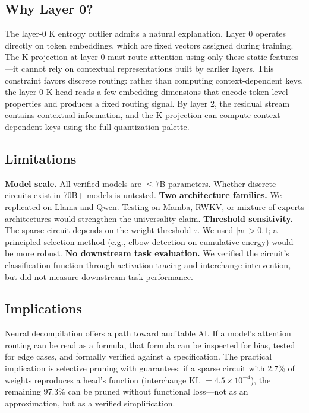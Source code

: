 \documentclass[11pt]{article}
\begin{document}
\subsection{Why Layer 0?}

The layer-0 K entropy outlier admits a natural explanation. Layer 0 operates directly on token embeddings, which are fixed vectors assigned during training. The K projection at layer 0 must route attention using only these static features---it cannot rely on contextual representations built by earlier layers. This constraint favors discrete routing: rather than computing context-dependent keys, the layer-0 K head reads a few embedding dimensions that encode token-level properties and produces a fixed routing signal. By layer 2, the residual stream contains contextual information, and the K projection can compute context-dependent keys using the full quantization palette.

\subsection{Limitations}

\textbf{Model scale.} All verified models are $\leq 7$B parameters. Whether discrete circuits exist in 70B+ models is untested. \textbf{Two architecture families.} We replicated on Llama and Qwen. Testing on Mamba, RWKV, or mixture-of-experts architectures would strengthen the universality claim. \textbf{Threshold sensitivity.} The sparse circuit depends on the weight threshold $\tau$. We used $|w| > 0.1$; a principled selection method (e.g., elbow detection on cumulative energy) would be more robust. \textbf{No downstream task evaluation.} We verified the circuit's classification function through activation tracing and interchange intervention, but did not measure downstream task performance.

\subsection{Implications}

Neural decompilation offers a path toward auditable AI. If a model's attention routing can be read as a formula, that formula can be inspected for bias, tested for edge cases, and formally verified against a specification. The practical implication is selective pruning with guarantees: if a sparse circuit with 2.7\% of weights reproduces a head's function (interchange KL $= 4.5 \times 10^{-4}$), the remaining 97.3\% can be pruned without functional loss---not as an approximation, but as a verified simplification.
\end{document}
